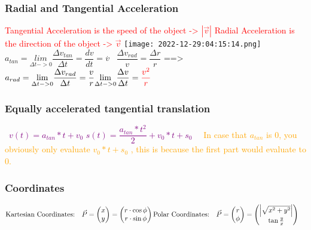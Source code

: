 \documentclass[main.tex,fontsize=8pt,paper=a4,paper=portrait,DIV=calc,]{scrartcl}
\begin{document}
\begin{multicols*}{2}
\subsubsection{Radial and Tangential Acceleration}
\textcolor{red}{Tangential Acceleration is the speed of the object -> \(|\vec{v}|\)}\newline
\textcolor{red}{Radial Acceleration is the direction of the object -> \(\vec{v}\)}\newline
\texttt{[image: 2022-12-29:04:15:14.png]}\newline
\, \newline
\large \( a_{tan} = \underset{\Delta t -> 0}{lim} \dfrac{\Delta v_{tan}}{\Delta t} = \dfrac{dv}{dt} = \overset{.}{v} \) \newline
\, \newline
\large \( \dfrac{\Delta v_{rad}}{v} = \dfrac{\Delta r}{r}\) ==> \( a_{rad} = \underset{\Delta t -> 0}{\lim} \dfrac{\Delta v_{rad}}{\Delta t} = \dfrac{v}{r}\underset{\Delta t -> 0}{\lim} \dfrac{\Delta v}{\Delta t} = \textcolor{red}{\dfrac{v^2}{r}} \) \newline
\, \newline \normalsize

\subsubsection{Equally accelerated tangential translation}
\, \newline
\large \textcolor{purple}{\( v(t) = a_{tan} * t + v_0 \)}\newline
\large \textcolor{purple}{\( s(t) = \dfrac{a_{tan} * t^2}{2} + v_0 * t + s_0\)} \newline
\, \newline \normalsize \
\textcolor{orange}{In case that \(a_{tan}\) is 0, you obviously only evaluate \(v_0 * t + s_0\) , this is because the first part would evaluate to 0.}

\subsubsection{Coordinates}
\(\text{Kartesian Coordinates:} \quad\vec{P}= \begin{pmatrix}x\\y \end{pmatrix} = \begin{pmatrix}r\cdot \cos\phi\\ r\cdot \sin\phi\end{pmatrix}\quad \newline
\text{Polar Coordinates:} \quad\vec{P}= \begin{pmatrix}r\\ \phi \end{pmatrix} = \begin{pmatrix}\left|\sqrt{x^2+y^2}\right|\\ \tan\frac{y}{x}\end{pmatrix}\quad\)


\end{multicols*}
\end{document}
